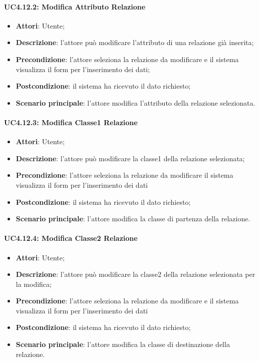\begin{itemize}
\begin{itemize}
\begin{itemize}
\begin{itemize}
\paragraph{UC4.12.2: Modifica Attributo Relazione}
\label{UC4.12.2}
\begin{itemize}
	\item \textbf{Attori}: Utente;
	\item \textbf{Descrizione}: l'attore può modificare l'attributo di una relazione già inserita;
	\item \textbf{Precondizione}: l'attore seleziona la relazione da modificare e il sistema visualizza il form per l'inserimento dei dati;
	\item \textbf{Postcondizione}: il sistema ha ricevuto il dato richiesto;
	\item \textbf{Scenario principale}: l'attore modifica l'attributo della relazione selezionata.
\end{itemize}

\paragraph{UC4.12.3: Modifica Classe1 Relazione}
\label{UC4.12.3}
\begin{itemize}
	\item \textbf{Attori}: Utente;
	\item \textbf{Descrizione}: l'attore può modificare la classe1 della relazione selezionata;
	\item \textbf{Precondizione}: l'attore seleziona la relazione da modificare il sistema visualizza il form per l'inserimento dei dati
	\item \textbf{Postcondizione}: il sistema ha ricevuto il dato richiesto;
	\item \textbf{Scenario principale}: l'attore modifica la classe di partenza della relazione.
\end{itemize}

\paragraph{UC4.12.4: Modifica Classe2 Relazione}
\label{UC4.12.4}
\begin{itemize}
	\item \textbf{Attori}: Utente;
	\item \textbf{Descrizione}: l'attore può modificare la classe2 della relazione selezionata per la modifica;
	\item \textbf{Precondizione}: l'attore seleziona la relazione da modificare e il sistema visualizza il form per l'inserimento dei dati
	\item \textbf{Postcondizione}: il sistema ha ricevuto il dato richiesto;
	\item \textbf{Scenario principale}: l'attore modifica la classe di destinazione della relazione.
\end{itemize}


\end{itemize}
\end{itemize}
\end{itemize}
\end{itemize}
